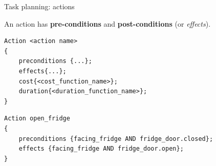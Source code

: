 \documentclass[compress]{beamer}
\begin{document}
\begin{frame}[fragile]{Task planning: actions}

    An action has \textbf{pre-conditions} and \textbf{post-conditions} (or \emph{effects}).

\begin{verbatim}
Action <action name>
{
    preconditions {...};
    effects{...};
    cost{<cost_function_name>};
    duration{<duration_function_name>};
}
\end{verbatim}

\pause

\begin{verbatim}
Action open_fridge
{
    preconditions {facing_fridge AND fridge_door.closed};
    effects {facing_fridge AND fridge_door.open};
}
\end{verbatim}

\end{frame}
\end{document}
